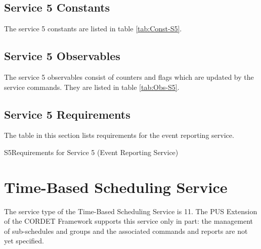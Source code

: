 \documentclass{pnp_article}
\begin{document}
\newpage
\subsection{Service 5 Constants}\label{sec:serv5Const}
The service 5 constants are listed in table \ref{tab:Const-S5}. 



\subsection{Service 5 Observables}\label{sec:serv5Obs}
The service 5 observables consist of counters and flags which are updated by the service commands. They are listed in table \ref{tab:Obs-S5}.



\newpage
\subsection{Service 5 Requirements}
The table in this section lists requirements for the event reporting service.

\begin{crReq}{S5}{Requirements for Service 5 (Event Reporting Service)}
\end{crReq}



\section{Time-Based Scheduling Service}\label{sec:serv11}
The service type of the Time-Based Scheduling Service is 11. The PUS Extension of the CORDET Framework supports this service only in part: the management of sub-schedules and groups and the associated commands and reports are not yet specified. 
\end{document}
